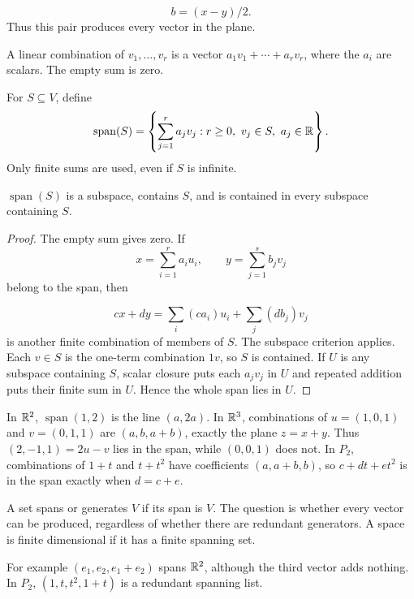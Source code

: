 \[
b=(x-y)/2.
\]
 Thus this pair produces every vector in the plane.
\begin{definition}
A linear combination of $v_1,\ldots,v_r$ is a vector
$a_1v_1+\cdots+a_rv_r$, where the $a_i$ are scalars. The empty sum is zero.
\end{definition}
\begin{definition}[Span]
For $S\subseteq V$, define
\[
\operatorname{span}(S)=\left\{\sum_{j=1}^r a_jv_j:r\geq0,\ v_j\in S,\ a_j\in\mathbb{R}\right\}.
\]
Only finite sums are used, even if $S$ is infinite.
\end{definition}
\begin{proposition}
$\operatorname{span}(S)$ is a subspace, contains $S$, and is contained in
every subspace containing $S$.
\end{proposition}
\begin{proof}
The empty sum gives zero. If
\[
x=\sum_{i=1}^r a_iu_i,\qquad y=\sum_{j=1}^s b_jv_j
\]
 belong to the span, then

\[
cx+dy=\sum_i(ca_i)u_i+\sum_j(db_j)v_j
\]
 is another finite combination
of members of $S$. The subspace criterion applies. Each $v\in S$ is the
one-term combination $1v$, so $S$ is contained. If $U$ is any subspace
containing $S$, scalar closure puts each $a_jv_j$ in $U$ and repeated
addition puts their finite sum in $U$. Hence the whole span lies in $U$.
\end{proof}
\begin{example}
In $\mathbb{R}^2$, $\operatorname{span}(1,2)$ is the line $(a,2a)$.
In $\mathbb{R}^3$, combinations of $u=(1,0,1)$ and $v=(0,1,1)$ are
$(a,b,a+b)$, exactly the plane $z=x+y$. Thus $(2,-1,1)=2u-v$ lies in
the span, while $(0,0,1)$ does not. In $P_2$, combinations of $1+t$
and $t+t^2$ have coefficients $(a,a+b,b)$, so $c+dt+et^2$ is in the
span exactly when $d=c+e$.
\end{example}
\begin{definition}
A set spans or generates $V$ if its span is $V$. The question is whether
every vector can be produced, regardless of whether there are redundant
generators. A space is finite dimensional if it has a finite spanning set.
\end{definition}
For example $(e_1,e_2,e_1+e_2)$ spans $\mathbb{R}^2$, although the third vector
adds nothing. In $P_2$, $(1,t,t^2,1+t)$ is a redundant spanning list.

